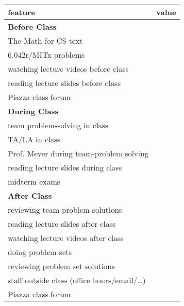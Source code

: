 \documentclass[handout]{mcs}
\begin{document}
\begin{center}
\begin{tabular}{| l | c |}
\hline
\hspace{1in} feature &  value\\  %
\hline  \hline
\textbf{Before Class} \\ \hline \hline
   The Math for CS text          & \\  \hline
   6.042r/MITx problems & \\  \hline
   watching lecture videos before class    & \\  \hline
   reading lecture slides before class    & \\  \hline
   Piazza class forum  & \\  \hline
\hline
\textbf{During Class}\\ \hline \hline
   team problem-solving in class  & \\   \hline
   TA/LA in class        & \\  \hline
   Prof. Meyer during team-problem solving &\\ \hline
   reading lecture slides during class    & \\  \hline
   midterm exams                   & \\  \hline
\hline
\textbf{After Class}\\ \hline \hline
   reviewing team problem solutions       & \\  \hline
   reading lecture slides after class     & \\  \hline
   watching lecture videos after class     & \\  \hline
   doing problem sets          & \\  \hline
   reviewing problem set solutions & \\  \hline
   staff outside class (office hours/email/\dots) & \\  \hline
   Piazza class forum  & \\  \hline
\end{tabular}
\end{center}
\end{document}
